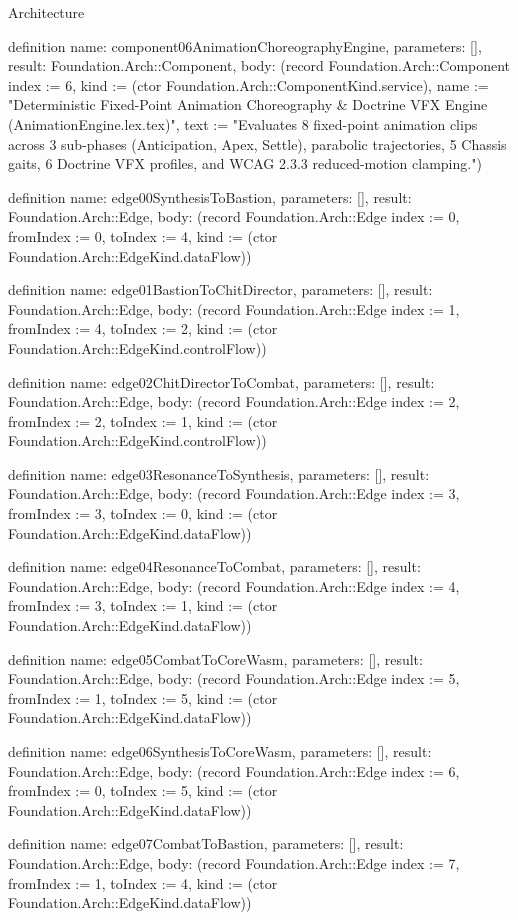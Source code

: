\begin{lexlean}{Architecture}
\begin{semanticmodule}
definition{
  name: component06AnimationChoreographyEngine,
  parameters: [],
  result: Foundation.Arch::Component,
  body: (record Foundation.Arch::Component {index := 6, kind := (ctor Foundation.Arch::ComponentKind.service), name := "Deterministic Fixed-Point Animation Choreography & Doctrine VFX Engine (AnimationEngine.lex.tex)", text := "Evaluates 8 fixed-point animation clips across 3 sub-phases (Anticipation, Apex, Settle), parabolic trajectories, 5 Chassis gaits, 6 Doctrine VFX profiles, and WCAG 2.3.3 reduced-motion clamping."})
}

definition{
  name: edge00SynthesisToBastion,
  parameters: [],
  result: Foundation.Arch::Edge,
  body: (record Foundation.Arch::Edge {index := 0, fromIndex := 0, toIndex := 4, kind := (ctor Foundation.Arch::EdgeKind.dataFlow)})
}

definition{
  name: edge01BastionToChitDirector,
  parameters: [],
  result: Foundation.Arch::Edge,
  body: (record Foundation.Arch::Edge {index := 1, fromIndex := 4, toIndex := 2, kind := (ctor Foundation.Arch::EdgeKind.controlFlow)})
}

definition{
  name: edge02ChitDirectorToCombat,
  parameters: [],
  result: Foundation.Arch::Edge,
  body: (record Foundation.Arch::Edge {index := 2, fromIndex := 2, toIndex := 1, kind := (ctor Foundation.Arch::EdgeKind.controlFlow)})
}

definition{
  name: edge03ResonanceToSynthesis,
  parameters: [],
  result: Foundation.Arch::Edge,
  body: (record Foundation.Arch::Edge {index := 3, fromIndex := 3, toIndex := 0, kind := (ctor Foundation.Arch::EdgeKind.dataFlow)})
}

definition{
  name: edge04ResonanceToCombat,
  parameters: [],
  result: Foundation.Arch::Edge,
  body: (record Foundation.Arch::Edge {index := 4, fromIndex := 3, toIndex := 1, kind := (ctor Foundation.Arch::EdgeKind.dataFlow)})
}

definition{
  name: edge05CombatToCoreWasm,
  parameters: [],
  result: Foundation.Arch::Edge,
  body: (record Foundation.Arch::Edge {index := 5, fromIndex := 1, toIndex := 5, kind := (ctor Foundation.Arch::EdgeKind.dataFlow)})
}

definition{
  name: edge06SynthesisToCoreWasm,
  parameters: [],
  result: Foundation.Arch::Edge,
  body: (record Foundation.Arch::Edge {index := 6, fromIndex := 0, toIndex := 5, kind := (ctor Foundation.Arch::EdgeKind.dataFlow)})
}

definition{
  name: edge07CombatToBastion,
  parameters: [],
  result: Foundation.Arch::Edge,
  body: (record Foundation.Arch::Edge {index := 7, fromIndex := 1, toIndex := 4, kind := (ctor Foundation.Arch::EdgeKind.dataFlow)})
}


\end{semanticmodule}
\end{lexlean}
